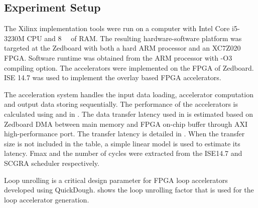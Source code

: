 \subsection{Experiment Setup} \label{subsec:setup}
The Xilinx implementation tools were run on a computer with Intel Core i5-3230M CPU and
\SI{8}{\giga\byte} of RAM. The resulting hardware-software platform was targeted at 
the Zedboard with both a hard ARM processor and an XC7Z020 FPGA. Software runtime was obtained 
from the ARM processor with -O3 compiling option. The accelerators were implemented on 
the FPGA of Zedboard. ISE 14.7 was used to implement the overlay based FPGA accelerators. 

The acceleration system handles the input data loading, accelerator computation and output data
storing sequentially. The performance of the accelerators is calculated using 
and  in . The data transfer latency used in
 is estimated based on Zedboard DMA between main memory and FPGA on-chip buffer
through AXI high-performance port. The
transfer latency is detailed in . When the transfer size is not included in the
table, a simple linear model is used to estimate its latency. Fmax and the number of cycles were
extracted from the ISE14.7 and SCGRA scheduler respectively. 
 
\begin{table}
    \centering
    \caption{DMA transfer latency on Zedboard through AXI high performance port \label{tab:latency}}{
        \centering
    }
\end{table}

Loop unrolling is a critical design parameter for FPGA loop accelerators developed 
using QuickDough.  shows the loop unrolling factor that 
is used for the loop accelerator generation. 

